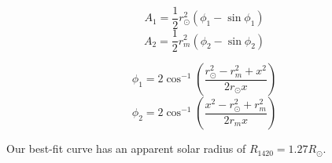 \begin{equation}
  A_1 = \frac{1}{2}r_{\odot}^2\left(\phi_1 - \sin\phi_1\right)
\end{equation}
\begin{equation}
  A_2 = \frac{1}{2}r_{m}^2\left(\phi_2 - \sin\phi_2\right)
\end{equation}

\begin{equation}
  \phi_1 = 2\cos^{-1}\left(\frac{r_{\odot}^2 - r_{m}^2+x^2}{2r_{\odot}x}\right)
\end{equation}
\begin{equation}
  \phi_2 = 2\cos^{-1}\left(\frac{x^2 - r_{\odot}^2 + r_{m}^2}{2r_{m}x}\right)
\end{equation}

Our best-fit curve has an apparent solar radius of $R_{\mathrm{1420}} = 1.27 R_{\odot}$.
